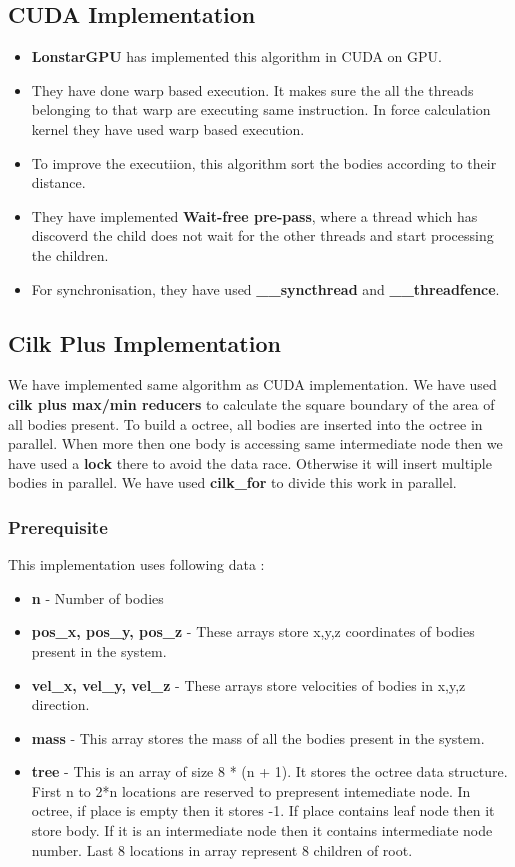 \documentclass{article}
\begin{document}
\subsection{CUDA Implementation}
\begin{itemize}
\item \textbf{LonstarGPU} has implemented this algorithm in CUDA on GPU.
\item They have done warp based execution. It makes sure the all the threads belonging to that warp are executing same instruction. In force calculation kernel they have used warp based execution.
\item To improve the executiion, this algorithm sort the bodies according to their distance.
\item They have implemented \textbf{Wait-free pre-pass}, where a thread which has discoverd the child does not wait for the other threads and start processing the children.
\item For synchronisation, they have used \textbf{\_\_syncthread} and \textbf{\_\_threadfence}. 
\end{itemize}


\subsection{Cilk Plus Implementation}

We have implemented same algorithm as CUDA implementation. We have used \textbf{cilk plus max/min reducers} to calculate the square boundary of the area of all bodies present. To build a octree, all bodies are inserted into the octree in parallel. When more then one body is accessing same intermediate node then we have used a \textbf{lock} there to avoid the data race. Otherwise it will insert multiple bodies in parallel. We have used \textbf{cilk\_for} to divide this work in parallel. 

\subsubsection{Prerequisite}
This implementation uses following data :

\begin{itemize}
\item \textbf{n} - Number of bodies
\item \textbf{pos\_x, pos\_y, pos\_z} - These arrays store x,y,z coordinates of bodies present in the system.
\item \textbf{vel\_x, vel\_y, vel\_z} - These arrays store velocities of bodies in x,y,z direction.
\item \textbf{mass} - This array stores the mass of all the bodies present in the system.
\item \textbf{tree} - This is an array of size 8 * (n + 1). It stores the octree data structure. First n to 2*n locations are reserved to prepresent intemediate node. In octree, if place is empty then it stores -1. If place contains leaf node then it store body. If it is an intermediate node then it contains intermediate node number. Last 8 locations in array represent 8 children of root.  
\end{itemize}
\end{document}
